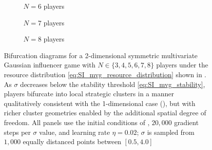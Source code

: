 \documentclass{article}
\begin{document}
\begin{figure}[ht!]
        \begin{subfigure}[b]{0.3\linewidth}
            \centering
                
            \caption{$N = 6$ players}\label{fig:2d_mvg_bifurcation:e}
            \vspace{4ex}
        \end{subfigure}
        \begin{subfigure}[b]{0.3\linewidth}
            \centering
                
            \caption{$N = 7$ players}\label{fig:2d_mvg_bifurcation:f}
            \vspace{4ex}
        \end{subfigure}
        \begin{subfigure}[b]{0.3\linewidth}
            \centering
                
            \caption{$N = 8$ players}\label{fig:2d_mvg_bifurcation:g}
            \vspace{4ex}
        \end{subfigure}
        
        \begin{subfigure}[b]{0.75\linewidth}
            \centering
            
            \label{fig:2d_mvg_bifurcation:colorbar}
        \end{subfigure}

        \caption{Bifurcation diagrams for a 2-dimensional symmetric multivariate Gaussian influencer game with $N \in \{3,4,5,6,7,8\}$ players under the resource distribution \cref{eq:SI_mvg_resource_distribution} shown in . As $\sigma$ decreases below the stability threshold \cref{eq:SI_mvg_stability}, players bifurcate into local strategic clusters in a manner qualitatively consistent with the 1-dimensional case (), but with richer cluster geometries enabled by the additional spatial degree of freedom. All panels use the initial conditions of , $20{,}000$ gradient steps per $\sigma$ value, and learning rate $\eta = 0.02$; $\sigma$ is sampled from $1{,}000$ equally distanced points between $[0.5,4.0]$}\label{fig:2d_mvg_bifurcation}
    \end{figure}
    \clearpage
\end{document}
